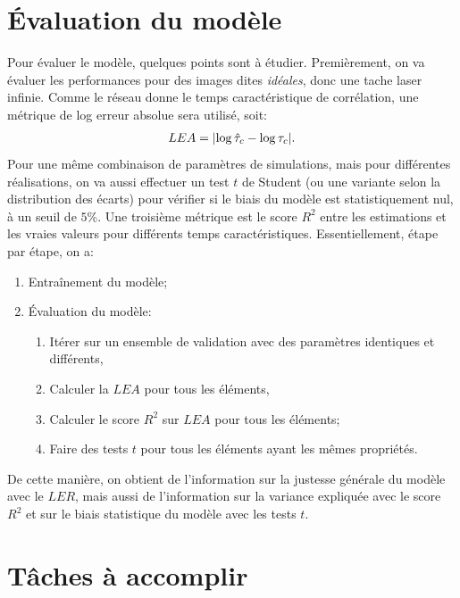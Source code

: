 \documentclass[MSc,french]{ulthese}
\begin{document}
\chapter{Évaluation du modèle}
Pour évaluer le modèle, quelques points sont à étudier. Premièrement, on va évaluer les performances pour des images dites \textit{idéales}, donc une tache laser infinie. Comme le réseau donne le temps caractéristique de corrélation, une métrique de log erreur absolue sera utilisé, soit:
\begin{align*}
LEA = \abs{\log{\hat{\tau}_c} - \log{\tau_c}}.
\end{align*}
Pour une même combinaison de paramètres de simulations, mais pour différentes réalisations, on va aussi effectuer un test $t$ de Student (ou une variante selon la distribution des écarts) pour vérifier si le biais du modèle est statistiquement nul, à un seuil de $5\%$. Une troisième métrique est le score $R^2$ entre les estimations et les vraies valeurs pour différents temps caractéristiques. Essentiellement, étape par étape, on a:
\begin{enumerate}
\item Entraînement du modèle;
\item Évaluation du modèle:
\begin{enumerate}
\item Itérer sur un ensemble de validation avec des paramètres identiques et différents,
\item Calculer la $LEA$ pour tous les éléments,
\item Calculer le score $R^2$ sur $LEA$ pour tous les éléments;
\item Faire des tests $t$ pour tous les éléments ayant les mêmes propriétés.
\end{enumerate}
\end{enumerate}
De cette manière, on obtient de l'information sur la justesse générale du modèle avec le $LER$, mais aussi de l'information sur la variance expliquée avec le score $R^2$ et sur le biais statistique du modèle avec les tests $t$.
\newpage
\chapter{Tâches à accomplir}
\end{document}
